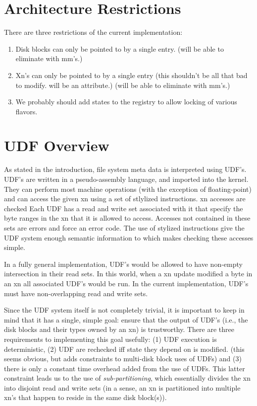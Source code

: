 \section{Architecture Restrictions}

There are three restrictions of the current implementation:
\begin{enumerate}
        \item Disk blocks can only be pointed to by a single entry.
                (will be able to eliminate with mm's.)

        \item Xn's can only be pointed to by a single entry (this
        shouldn't be all that bad to modify.  will be an attribute.)
                (will be able to eliminate with mm's.)

        \item We probably should add states to the registry to allow
        locking of various flavors.
\end{enumerate}


\section{UDF Overview}


As stated in the introduction, file system meta data is interpreted 
using UDF's.  UDF's are written in a pseudo-assembly language, and
imported into the kernel.  They can perform most machine operations
(with the exception of floating-point) and can access the given xn
using a set of stlylized instructions.  xn accesses are checked
Each UDF has a read and write set associated
with it that specify the byte ranges in the xn that it is allowed
to access.  Accesses not contained in these sets are errors and force
an error code.  The use of stylized instructions give the UDF system
enough semantic information to which makes checking these accesses simple.


In a fully general implementation, UDF's would be allowed to have
non-empty intersection in their read sets.  In this world, when a xn
update modified a byte in an xn all associated UDF's would be run.  In
the current implementation, UDF's must have non-overlapping read and
write sets.

Since the UDF system itself is not completely trivial, it is important
to keep in mind that it has a single, simple goal:  ensure that the
output of UDF's (i.e., the disk blocks and their types owned by an xn)
is trustworthy.  There are three requirements to implementing this goal
usefully:  (1) UDF execution is deterministic, (2) UDF are rechecked
iff state they depend on is modified.  (this seems obvious, but adds
constraints to multi-disk block uses of UDFs) and (3) there is only a
constant time overhead added from the use of UDFs.  This latter
constraint leads us to the use of {\em sub-partitioning}, which
essentially divides the xn into disjoint read and write sets (in a
sense, an xn is partitioned into multiple xn's that happen to reside in
the same disk block(s)).

